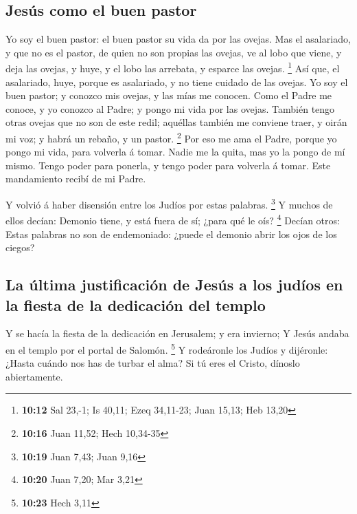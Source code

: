 \hypertarget{jesuxfas-como-el-buen-pastor}{%
\subsection{Jesús como el buen
pastor}\label{jesuxfas-como-el-buen-pastor}}

 Yo soy el buen pastor: el buen pastor su vida da por las
ovejas.  Mas el asalariado, y que no es el pastor, de quien
no son propias las ovejas, ve al lobo que viene, y deja las ovejas, y
huye, y el lobo las arrebata, y esparce las ovejas. \footnote{\textbf{10:12}
  Sal 23,-1; Is 40,11; Ezeq 34,11-23; Juan 15,13; Heb 13,20}
 Así que, el asalariado, huye, porque es asalariado, y no
tiene cuidado de las ovejas.  Yo soy el buen pastor; y
conozco mis ovejas, y las mías me conocen.  Como el Padre
me conoce, y yo conozco al Padre; y pongo mi vida por las ovejas.
 También tengo otras ovejas que no son de este redil;
aquéllas también me conviene traer, y oirán mi voz; y habrá un rebaño, y
un pastor. \footnote{\textbf{10:16} Juan 11,52; Hech 10,34-35}
 Por eso me ama el Padre, porque yo pongo mi vida, para
volverla á tomar.  Nadie me la quita, mas yo la pongo de mí
mismo. Tengo poder para ponerla, y tengo poder para volverla á tomar.
Este mandamiento recibí de mi Padre.

 Y volvió á haber disensión entre los Judíos por estas
palabras. \footnote{\textbf{10:19} Juan 7,43; Juan 9,16}  Y
muchos de ellos decían: Demonio tiene, y está fuera de sí; ¿para qué le
oís? \footnote{\textbf{10:20} Juan 7,20; Mar 3,21}  Decían
otros: Estas palabras no son de endemoniado: ¿puede el demonio abrir los
ojos de los ciegos?

\hypertarget{la-uxfaltima-justificaciuxf3n-de-jesuxfas-a-los-juduxedos-en-la-fiesta-de-la-dedicaciuxf3n-del-templo}{%
\subsection{La última justificación de Jesús a los judíos en la fiesta
de la dedicación del
templo}\label{la-uxfaltima-justificaciuxf3n-de-jesuxfas-a-los-juduxedos-en-la-fiesta-de-la-dedicaciuxf3n-del-templo}}

 Y se hacía la fiesta de la dedicación en Jerusalem; y era
invierno;  Y Jesús andaba en el templo por el portal de
Salomón. \footnote{\textbf{10:23} Hech 3,11}  Y rodeáronle
los Judíos y dijéronle: ¿Hasta cuándo nos has de turbar el alma? Si tú
eres el Cristo, dínoslo abiertamente.

